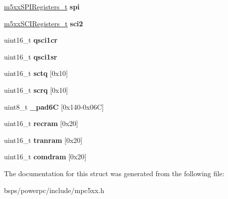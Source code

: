 \begin{DoxyCompactItemize}
\mbox{\label{structm5xxQSMCMRegisters___a10a7687c38d287542935903ac6d91b3c}} 
\mbox{\hyperlink{structm5xxSPIRegisters__}{m5xx\+S\+P\+I\+Registers\+\_\+t}} {\bfseries spi}
\item 
\mbox{\label{structm5xxQSMCMRegisters___af887944a6d2bfad9dd43023468c60b1e}} 
\mbox{\hyperlink{structm5xxSCIRegisters__}{m5xx\+S\+C\+I\+Registers\+\_\+t}} {\bfseries sci2}
\item 
\mbox{\label{structm5xxQSMCMRegisters___a57fdf2e22dc2d5a490321d7c530cb59e}} 
uint16\+\_\+t {\bfseries qsci1cr}
\item 
\mbox{\label{structm5xxQSMCMRegisters___acfda7e0540da44ea0f746a14e022e4f0}} 
uint16\+\_\+t {\bfseries qsci1sr}
\item 
\mbox{\label{structm5xxQSMCMRegisters___af323a3c87e3bbbc6f7764e975a1a919b}} 
uint16\+\_\+t {\bfseries sctq} \mbox{[}0x10\mbox{]}
\item 
\mbox{\label{structm5xxQSMCMRegisters___a9d34c6c1b7ef38902bf182955a4a9908}} 
uint16\+\_\+t {\bfseries scrq} \mbox{[}0x10\mbox{]}
\item 
\mbox{\label{structm5xxQSMCMRegisters___a79231332cd5fd83cdae880dcd9df5e37}} 
uint8\+\_\+t {\bfseries \+\_\+pad6C} \mbox{[}0x140-\/0x06\+C\mbox{]}
\item 
\mbox{\label{structm5xxQSMCMRegisters___ac8955d8b16aaf4826eb3ac3262729a53}} 
uint16\+\_\+t {\bfseries recram} \mbox{[}0x20\mbox{]}
\item 
\mbox{\label{structm5xxQSMCMRegisters___a9f060123c3315fb6a6ad9dae0aa46a02}} 
uint16\+\_\+t {\bfseries tranram} \mbox{[}0x20\mbox{]}
\item 
\mbox{\label{structm5xxQSMCMRegisters___a8e350f103261ac6eb40f444e77356c28}} 
uint16\+\_\+t {\bfseries comdram} \mbox{[}0x20\mbox{]}
\end{DoxyCompactItemize}


The documentation for this struct was generated from the following file\+:\begin{DoxyCompactItemize}
\item 
bsps/powerpc/include/mpc5xx.\+h\end{DoxyCompactItemize}
